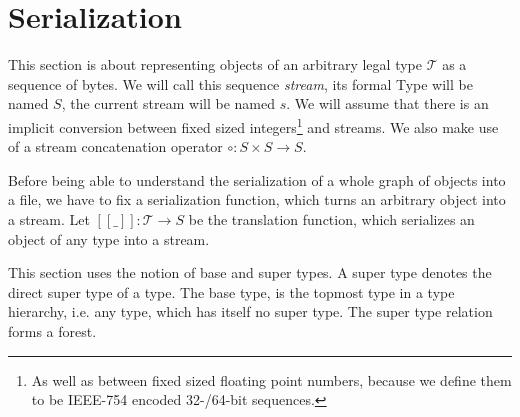 \documentclass[a4paper,10pt]{article}
\newcommand{\den}[1]{[\![#1]\!]}
\begin{document}
\section{Serialization}

This section is about representing objects of an arbitrary legal type $\mathcal{T}$ as a sequence of bytes. We will call this sequence \textit{stream}, its formal Type will be named $S$, the current stream will be named $s$. We will assume that there is an implicit conversion between fixed sized integers\footnote{As well as between fixed sized floating point numbers, because we define them to be IEEE-754 encoded 32-/64-bit sequences.} and streams. We also make use of a stream concatenation operator $\circ : S \times S → S$.

Before being able to understand the serialization of a whole graph of objects into a file, we have to fix a serialization function, which turns an arbitrary object into a stream. Let $\den{\_}:\mathcal{T} → S$ be the translation function, which serializes an object of any type into a stream.

This section uses the notion of base and super types. A super type denotes the direct super type of a type. The base type, is the topmost type in a type hierarchy, i.e. any type, which has itself no super type.
The super type relation forms a forest.
\end{document}
